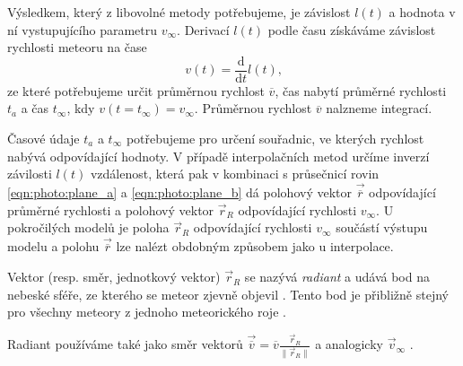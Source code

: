 Výsledkem, který z libovolné metody potřebujeme, je závislost $l(t)$ a hodnota v ní vystupujícího parametru $v_\infty$. Derivací $l(t)$ podle času získáváme závislost rychlosti meteoru na čase
$$
    v(t)=\frac{\text{d}}{\text{d}t}l(t)\text{,}
$$
ze které potřebujeme určit průměrnou rychlost $\overline{v}$, čas nabytí průměrné rychlosti $t_a$ a čas $t_\infty$, kdy $v(t\! =\!t_\infty)=v_\infty$. Průměrnou rychlost $\overline{v}$ nalzneme integrací.

Časové údaje $t_a$ a $t_\infty$ potřebujeme pro určení souřadnic, ve kterých rychlost nabývá odpovídající hodnoty. V případě interpolačních metod určíme inverzí závilosti $l(t)$ vzdálenost, která pak v kombinaci s průsečnicí rovin \eqref{eqn:photo:plane_a} a \eqref{eqn:photo:plane_b} dá polohový vektor $\vec{\overline{r}}$ odpovídající průměrné rychlosti a polohový vektor $\vec{r}_R$ odpovídající rychlosti $v_\infty$. U pokročilých modelů je poloha $\vec{r}_R$ odpovídající rychlosti $v_\infty$ součástí výstupu modelu \cite{singlebodymeteor} a polohu $\vec{\overline{r}}$ lze nalézt obdobným způsobem jako u interpolace.

\smallskip

Vektor (resp. směr, jednotkový vektor) $\vec{r}_R$ se nazývá \textit{radiant} a udává bod na nebeské sféře, ze kterého se meteor zjevně objevil \cite{ceplecha}\cite{glossary}. Tento bod je přibližně stejný pro všechny meteory z jednoho meteorického roje \cite{glossary}.

Radiant používáme také jako směr vektorů $\vec{\overline{v}}=\overline{v}\frac{\vec{r}_R}{\lVert\vec{r}_R\rVert}$ a analogicky $\vec{v}_\infty$ \cite{ceplecha}.

\medskip

